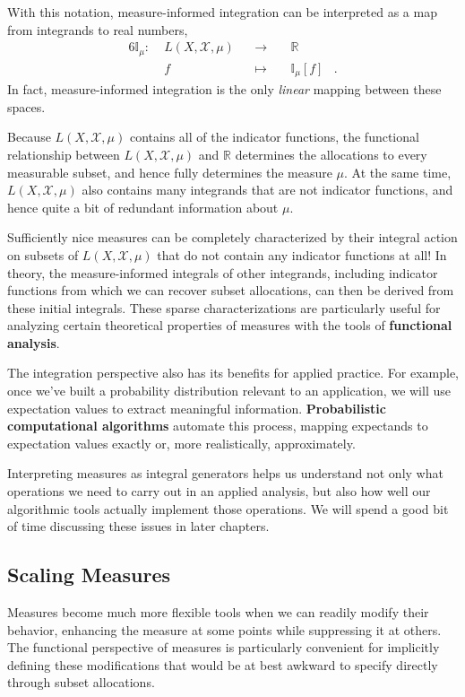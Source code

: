 \documentclass[
  letterpaper,
  DIV=11,
  numbers=noendperiod]{scrartcl}
\begin{document}
With this notation, measure-informed integration can be interpreted as a
map from integrands to real numbers, \begin{alignat*}{6}
\mathbb{I}_{\mu} :\; & L(X, \mathcal{X}, \mu) & &\rightarrow& \;
& \mathbb{R} &
\\
& f & &\mapsto& & \mathbb{I}_{\mu}[f] &.
\end{alignat*} In fact, measure-informed integration is the only
\emph{linear} mapping between these spaces.

Because \(L(X, \mathcal{X}, \mu)\) contains all of the indicator
functions, the functional relationship between
\(L(X, \mathcal{X}, \mu)\) and \(\mathbb{R}\) determines the allocations
to every measurable subset, and hence fully determines the measure
\(\mu\). At the same time, \(L(X, \mathcal{X}, \mu)\) also contains many
integrands that are not indicator functions, and hence quite a bit of
redundant information about \(\mu\).

Sufficiently nice measures can be completely characterized by their
integral action on subsets of \(L(X, \mathcal{X}, \mu)\) that do not
contain any indicator functions at all! In theory, the measure-informed
integrals of other integrands, including indicator functions from which
we can recover subset allocations, can then be derived from these
initial integrals. These sparse characterizations are particularly
useful for analyzing certain theoretical properties of measures with the
tools of \textbf{functional analysis}.

The integration perspective also has its benefits for applied practice.
For example, once we've built a probability distribution relevant to an
application, we will use expectation values to extract meaningful
information. \textbf{Probabilistic computational algorithms} automate
this process, mapping expectands to expectation values exactly or, more
realistically, approximately.

Interpreting measures as integral generators helps us understand not
only what operations we need to carry out in an applied analysis, but
also how well our algorithmic tools actually implement those operations.
We will spend a good bit of time discussing these issues in later
chapters.

\subsection{Scaling Measures}\label{sec:scaling_measures}

Measures become much more flexible tools when we can readily modify
their behavior, enhancing the measure at some points while suppressing
it at others. The functional perspective of measures is particularly
convenient for implicitly defining these modifications that would be at
best awkward to specify directly through subset allocations.
\end{document}
